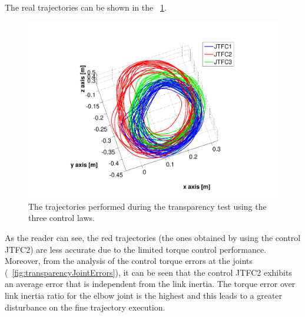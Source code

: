 \documentclass[journal]{IEEEtran}
\begin{document}
%
The real trajectories can be shown in the \figurename \ \ref{fig:traittorie3D}.
\begin{figure}[htb]
	\centering
	\includegraphics[width=0.99\columnwidth]{traiettorieCircolari2}
	\caption{The trajectories performed during the transparency test using the three control laws.}
	\label{fig:traittorie3D}
\end{figure}
%
\par As the reader can see, the red trajectories (the ones obtained by using the control JTFC2) are less accurate due to the limited torque control performance. Moreover, from the analysis of the control torque errors at the joints (\figurename \ \ref{fig:transparencyJointErrors}), it can be seen that the control JTFC2 exhibits an average error that is independent from the link inertia. The torque error over link inertia ratio for the elbow joint is the highest and this leads to a greater disturbance on the fine trajectory execution.
\end{document}

